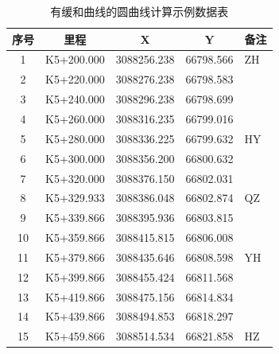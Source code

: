 \begin{table}[htbp]
\centering
\caption{有缓和曲线的圆曲线计算示例数据表}
\label{tab:HYRoute}
\begin{tabular}{ccccl}
\hline
序号 & 里程	    &        X	   &      Y	   &  备注 \\
\hline
1   & K5+200.000 & 3088256.238 & 66798.566 &  ZH  \\
2   & K5+220.000 & 3088276.238 & 66798.583 &      \\
3   & K5+240.000 & 3088296.238 & 66798.699 &      \\
4   & K5+260.000 & 3088316.235 & 66799.016 &      \\
5   & K5+280.000 & 3088336.225 & 66799.632 &  HY  \\
6   & K5+300.000 & 3088356.200 & 66800.632 &      \\
7   & K5+320.000 & 3088376.150 & 66802.031 &      \\
8   & K5+329.933 & 3088386.048 & 66802.874 &  QZ  \\
9   & K5+339.866 & 3088395.936 & 66803.815 &      \\
10  & K5+359.866 & 3088415.815 & 66806.008 &      \\
11  & K5+379.866 & 3088435.646 & 66808.598 &  YH  \\
12  & K5+399.866 & 3088455.424 & 66811.568 &      \\
13  & K5+419.866 & 3088475.156 & 66814.834 &      \\
14  & K5+439.866 & 3088494.853 & 66818.297 &      \\
15  & K5+459.866 & 3088514.534 & 66821.858 &  HZ  \\
\hline
\end{tabular}

\end{table}
